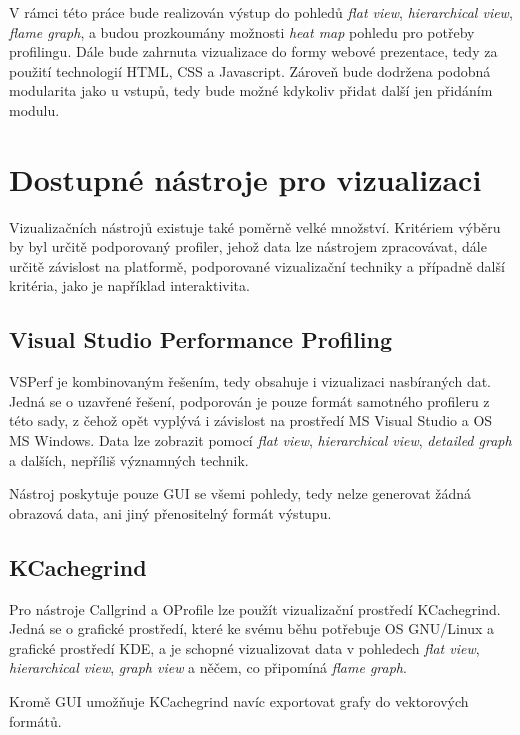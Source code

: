 \documentclass[czech,BP]{thesiskiv}
\begin{document}
V rámci této práce bude realizován výstup do pohledů \emph{flat view}, \emph{hierarchical view}, \emph{flame graph}, a budou prozkoumány možnosti \emph{heat map} pohledu pro potřeby profilingu. Dále bude zahrnuta vizualizace do formy webové prezentace, tedy za použití technologií HTML, CSS a Javascript. Zároveň bude dodržena podobná modularita jako u vstupů, tedy bude možné kdykoliv přidat další  jen přidáním modulu.


\newpage

\chapter{Dostupné nástroje pro vizualizaci}

Vizualizačních nástrojů existuje také poměrně velké množství. Kritériem výběru by byl určitě podporovaný profiler, jehož data lze nástrojem zpracovávat, dále určitě závislost na platformě, podporované vizualizační techniky a případně další kritéria, jako je například interaktivita.

\section{Visual Studio Performance Profiling}

VSPerf je kombinovaným řešením, tedy obsahuje i vizualizaci nasbíraných dat. Jedná se o uzavřené řešení, podporován je pouze formát samotného profileru z této sady, z čehož opět vyplývá i závislost na prostředí MS Visual Studio a OS MS Windows. Data lze zobrazit pomocí \emph{flat view}, \emph{hierarchical view}, \emph{detailed graph} a dalších, nepříliš významných technik.

Nástroj poskytuje pouze GUI se všemi pohledy, tedy nelze generovat žádná obrazová data, ani jiný přenositelný formát výstupu.

\section{KCachegrind}

Pro nástroje Callgrind a OProfile lze použít vizualizační prostředí KCachegrind. Jedná se o grafické prostředí, které ke svému běhu potřebuje OS GNU/Linux a grafické prostředí KDE, a je schopné vizualizovat data v pohledech \emph{flat view}, \emph{hierarchical view}, \emph{graph view} a něčem, co připomíná \emph{flame graph}.

Kromě GUI umožňuje KCachegrind navíc exportovat grafy do vektorových formátů.
\end{document}
